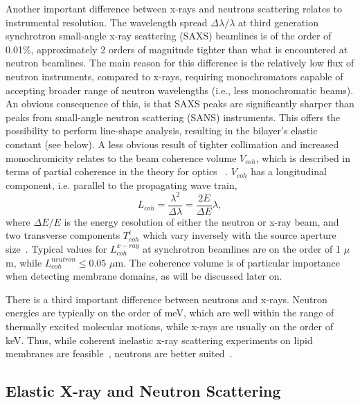 \documentclass[8.5pt,twoside,twocolumn]{article}
\begin{document}
Another important difference between x-rays and neutrons scattering relates to instrumental resolution. The wavelength spread $\Delta \lambda/\lambda$  at third generation synchrotron small-angle x-ray scattering (SAXS) beamlines is of the order of 0.01\%, approximately 2 orders of magnitude tighter than what is encountered at neutron beamlines. The main reason for this difference is the relatively low flux of neutron instruments, compared to x-rays, requiring monochromators capable of accepting broader range of neutron wavelengths (i.e., less monochromatic beams). An obvious consequence of this, is that SAXS peaks are significantly sharper than peaks from small-angle neutron scattering (SANS) instruments. This offers the possibility to perform line-shape analysis, resulting in the bilayer's elastic constant (see below). A less obvious result of tighter collimation and increased monochromicity relates to the beam coherence volume $V_{coh}$, which is described in terms of partial coherence in the theory for optics ~\cite{Born.1980}. $V_{coh}$ has a longitudinal component, i.e. parallel to the propagating wave train, 
\begin{equation}
L_{coh} = \frac{\lambda^2}{\Delta \lambda} = \frac{2 E}{\Delta E} \lambda,
\end{equation}
where $\Delta E/E$ is the energy resolution of either the neutron or x-ray beam, and two transverse components $T_{coh}^{i}$ which vary inversely with the source aperture size~\cite{Bernhoef.1998, Felber.1998}. Typical values for $L_{coh}^{x-ray}$ at synchrotron beamlines are on the order of 1 $\mu$m, while $L_{coh}^{neutron} \le 0.05$ $\mu$m. The coherence volume is of particular importance when detecting membrane domains, as will be discussed later on. 


There is a third important difference between neutrons and x-rays. Neutron energies are typically on the order of meV, which are well within the range of thermally excited molecular motions, while x-rays are usually on the order of keV. Thus, while coherent inelastic x-ray scattering experiments on lipid membranes are feasible~\cite{Chen.2001,Weiss.2003}, neutrons are better suited~\cite{Rheinstadter.2006}. 


\subsection{Elastic X-ray and Neutron Scattering}
\end{document}
